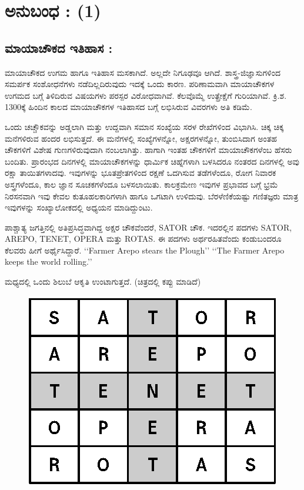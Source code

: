 
\chapter*{ಅನುಬಂಧ : (1)}

\section*{ಮಾಯಾಚೌಕದ ಇತಿಹಾಸ :}

ಮಾಯಾಚೌಕದ ಉಗಮ ಹಾಗೂ ಇತಿಹಾಸ ಮಸಕಾಗಿದೆ. ಅಲ್ಲದೇ ನಿಗೂಢವೂ ಆಗಿದೆ. ಶಾಸ್ತ್ರ-ಜಿಜ್ಞಾಸುಗಳಿಂದ ಸಮರ್ಪಕ ಸಂಶೋಧನೆಗಳು ನಡೆದಿಲ್ಲದಿರುವುದು ಇದಕ್ಕೆ ಒಂದು \linebreak ಕಾರಣ. ಪರಿಣಾಮವಾಗಿ ಮಾಯಾಚೌಕಗಳ ಉಗಮದ ಬಗ್ಗೆ ತಿಳಿದಿರುವ ವಿಷಯಗಳು \linebreak ಪರಸ್ಪರ ವಿರೋಧವಾಗಿವೆ. ಕೆಲವೊಮ್ಮೆ ಉತ್ಪ್ರೇಕ್ಷೆಗೆ ಗುರಿಯಾಗಿವೆ. ಕ್ರಿ.ಶ. 1300ಕ್ಕೆ ಹಿಂದಿನ ಕಾಲದ ಮಾಯಾಚೌಕಗಳ ಇತಿಹಾಸದ ಬಗ್ಗೆ ಲಭಿಸಿರುವ ವಿವರಗಳು ಅತಿ ಕಡಿಮೆ.

ಒಂದು ಚಚ್ಚೌಕವನ್ನು ಅಡ್ಡಲಾಗಿ ಮತ್ತು ಉದ್ದವಾಗಿ ಸಮಾನ ಸಂಖ್ಯೆಯ ಸರಳ ರೇಖೆಗಳಿಂದ ವಿಭಾಗಿಸಿ. ಚಿಕ್ಕ ಚಿಕ್ಕ ಮನೆಗಳಿರುವ ಹಂದರ ಲಭಿಸುತ್ತದೆ. ಈ ಮನೆಗಳಲ್ಲಿ ಸಂಖ್ಯೆಗಳನ್ನೋ, ಅಕ್ಷರಗಳನ್ನೋ, ತುಂಬಿಸಿದಾಗ ಅಂತಹ ಚೌಕಗಳಿಗೆ ವಿಶೇಷ ಗುಣಗಳಿರು\-ವುದಾಗಿ ನಂಬಲಾಗಿತ್ತು. ಹಾಗಾಗಿ ಇಂತಹ ಚೌಕಗಳಿಗೆ ಮಾಯಾಚೌಕಗಳೆಂಬ ಹೆಸರು ಬಂದಿತು. \linebreak ಪ್ರಾರಂಭದ ದಿನಗಳಲ್ಲಿ ಮಾಯಾಚೌಕಗಳನ್ನು ಧಾರ್ಮಿಕ ಚಿಹ್ನೆಗಳಾಗಿ ಬಳಸಿದರೂ ನಂತ\-ರದ ದಿನಗಳಲ್ಲಿ ಅವು ರಕ್ಷಾ ತಾಯಿತಗಳಾದವು. ಇವುಗಳನ್ನು ಭೂತಪ್ರೇತಗಳಿಂದ ರಕ್ಷಣೆ ಒದಗಿಸುವ ತಡೆಗಳೆಂದೂ, ರೋಗ ನಿವಾರಕ ಅಸ್ತ್ರಗಳೆಂದೂ, ಕಾಲ ಜ್ಞಾನ ಸೂಚಕಗಳೆಂದೂ ಬಳಸ\-ಲಾಯಿತು. ಕಾಲಕ್ರಮೇಣ ಇವುಗಳ ಪ್ರಭಾವದ ಬಗ್ಗೆ ಭ್ರಮೆ ನಿರಸನವಾಗಿ ಇವು ಕೇವಲ ಕುತೂ\-ಹಲಕಾರಿಗಳಾಗಿ ಹಾಗೂ ಒಗಟಾಗಿ ಉಳಿದುವು. ಬೆರಳೆಣಿಕೆಯಷ್ಟು ಗಣಿತಜ್ಞರು  \hbox{ಮಾತ್ರ} ಇವುಗಳನ್ನು ಸಂಖ್ಯಾಲೋಕದಲ್ಲಿ ಅಧ್ಯಯನ ಮಾಡಿದ್ದುಂಟು.

ಪಾಶ್ಚಾತ್ಯ ಜಗತ್ತಿನಲ್ಲಿ ಅತಿಪ್ರಸಿದ್ಧವಾಗಿದ್ದ ಅಕ್ಷರ ಚೌಕವೆಂದರೆ, SATOR ಚೌಕ. ಇದರಲ್ಲಿನ ಪದಗಳು SATOR, AREPO, TENET, OPERA ಮತ್ತು ROTAS. ಈ ಪದಗಳು ಅರ್ಥರಹಿತವೆಂದು ಕಂಡುಬಂದರೂ ಕೆಲವರು ಹೀಗೆ ಅರ್ಥೈಸಿದ್ದಾರೆ. ‘‘Farmer Arepo stears the Plough’’ ‘‘The Farmer Arepo keeps the world rolling.’’

ಮಧ್ಯದಲ್ಲಿ ಒಂದು ಶಿಲುಬೆ ಆಕೃತಿ ಉಂಟಾಗುತ್ತದೆ. (ಚಿತ್ರದಲ್ಲಿ ಕಪ್ಪು ಮಾಡಿದೆ)
\begin{figure}[H]
\includegraphics[scale=.9]{src/figures/chap9/fig9-1.eps}
\end{figure}

